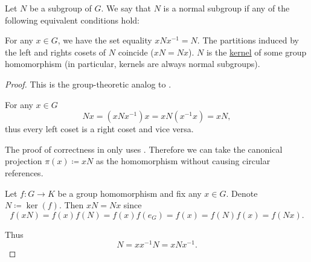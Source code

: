 \begin{definition}\label{def:normal_subgroup}
  Let \( N \) be a subgroup of \( G \). We say that \( N \) is a normal subgroup if any of the following equivalent conditions hold:
  \begin{DefEnum}
     For any \( x \in G \), we have the set equality \( x N x^{-1} = N \).
     The partitions induced by the left and rights cosets of \( N \) coincide (\( xN = Nx \)).
     \( N \) is the \hyperref[def:unital_magma_kernel]{kernel} of some group homomorphism (in particular, kernels are always normal subgroups).
  \end{DefEnum}
\end{definition}
\begin{proof}
  This is the group-theoretic analog to .

   For any \( x \in G \)
  \begin{equation*}
    Nx = (xNx^{-1})x = xN(x^{-1}x) = xN,
  \end{equation*}
  thus every left coset is a right coset and vice versa.

   The proof of correctness in  only uses . Therefore we can take the canonical projection \( \pi(x) \coloneqq xN \) as the homomorphism without causing circular references.

   Let \( f: G \to K \) be a group homomorphism and fix any \( x \in G \). Denote \( N \coloneqq \ker(f) \). Then \( xN = Nx \) since
  \begin{equation*}
    f(xN)
    =
    f(x) f(N)
    =
    f(x) f(e_G)
    =
    f(x)
    =
    f(N) f(x)
    =
    f(Nx).
  \end{equation*}

  Thus
  \begin{equation*}
    N = xx^{-1}N = xNx^{-1}.
  \end{equation*}
\end{proof}

